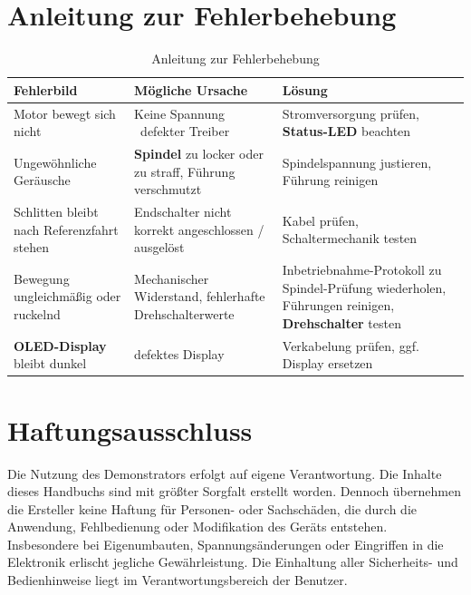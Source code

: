 \documentclass[a4paper,12pt,final]{report}
\begin{document}
	
	
	\chapter{Anleitung zur Fehlerbehebung}
	\begin{table}[h]
		\centering
		\begin{tabular}{|p{4cm}|p{5cm}|p{4cm}|}
			\hline
			\textbf{Fehlerbild} & \textbf{Mögliche Ursache} & \textbf{Lösung} \\ \hline
			Motor bewegt sich nicht & Keine Spannung \ defekter Treiber & Stromversorgung prüfen, \textbf{Status-LED} beachten \\ \hline
			Ungewöhnliche Geräusche & \textbf{Spindel} zu locker oder zu straff, Führung verschmutzt & Spindelspannung justieren, Führung reinigen \\ \hline
			Schlitten bleibt nach Referenzfahrt stehen & Endschalter nicht korrekt angeschlossen / ausgelöst & Kabel prüfen, Schaltermechanik testen \\ \hline
			Bewegung ungleichmäßig oder ruckelnd & Mechanischer Widerstand, fehlerhafte Drehschalterwerte & Inbetriebnahme-Protokoll zu Spindel-Prüfung wiederholen, Führungen reinigen, \textbf{Drehschalter} testen \\ \hline
			\textbf{OLED-Display} bleibt dunkel & defektes Display & Verkabelung prüfen, ggf. Display ersetzen \\ \hline

		\end{tabular}
		\caption{Anleitung zur Fehlerbehebung}
		\label{tab:fehlerbehebung}
	\end{table}
	
	
	\chapter{Haftungsausschluss}

		Die Nutzung des Demonstrators erfolgt auf eigene Verantwortung. Die Inhalte dieses Handbuchs sind mit größter Sorgfalt erstellt worden. Dennoch übernehmen die Ersteller keine Haftung für Personen- oder Sachschäden, die durch die Anwendung, Fehlbedienung oder Modifikation des Geräts entstehen. \\
		
		Insbesondere bei Eigenumbauten, Spannungsänderungen oder Eingriffen in die Elektronik erlischt jegliche Gewährleistung. Die Einhaltung aller Sicherheits- und Bedienhinweise liegt im Verantwortungsbereich der Benutzer. 
	
\end{document}
